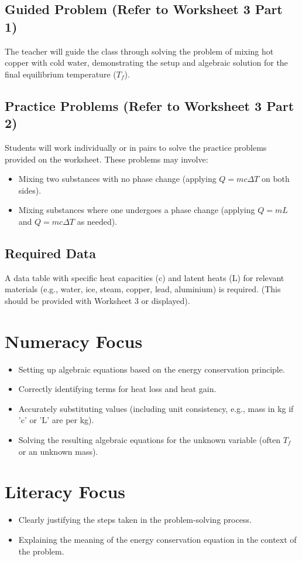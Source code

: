 \documentclass[11pt, a4paper]{article} %
\begin{document}
\subsection*{Guided Problem (Refer to Worksheet 3 Part 1)}
The teacher will guide the class through solving the problem of mixing hot copper with cold water, demonstrating the setup and algebraic solution for the final equilibrium temperature ($T_f$).

\subsection*{Practice Problems (Refer to Worksheet 3 Part 2)}
Students will work individually or in pairs to solve the practice problems provided on the worksheet. These problems may involve:
\begin{itemize}
    \item Mixing two substances with no phase change (applying $Q=mc\Delta T$ on both sides).
    \item Mixing substances where one undergoes a phase change (applying $Q=mL$ and $Q=mc\Delta T$ as needed).
\end{itemize}

\subsection*{Required Data}
A data table with specific heat capacities (c) and latent heats (L) for relevant materials (e.g., water, ice, steam, copper, lead, aluminium) is required. (This should be provided with Worksheet 3 or displayed).

\section*{Numeracy Focus}
\begin{itemize}
    \item Setting up algebraic equations based on the energy conservation principle.
    \item Correctly identifying terms for heat loss and heat gain.
    \item Accurately substituting values (including unit consistency, e.g., mass in kg if 'c' or 'L' are per kg).
    \item Solving the resulting algebraic equations for the unknown variable (often $T_f$ or an unknown mass).
\end{itemize}

\section*{Literacy Focus}
\begin{itemize}
    \item Clearly justifying the steps taken in the problem-solving process.
    \item Explaining the meaning of the energy conservation equation in the context of the problem.
\end{itemize}
\end{document}
